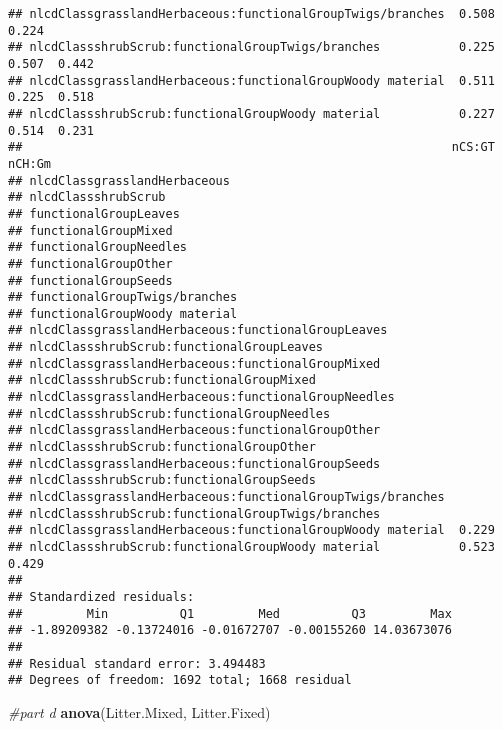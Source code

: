 \documentclass[]{article}
\newenvironment{Shaded}{\begin{snugshade}}{\end{snugshade}}
\newcommand{\CommentTok}[1]{\textcolor[rgb]{0.56,0.35,0.01}{\textit{#1}}}
\newcommand{\KeywordTok}[1]{\textcolor[rgb]{0.13,0.29,0.53}{\textbf{#1}}}
\newcommand{\NormalTok}[1]{#1}
\begin{document}
\begin{verbatim}
## nlcdClassgrasslandHerbaceous:functionalGroupTwigs/branches  0.508  0.224       
## nlcdClassshrubScrub:functionalGroupTwigs/branches           0.225  0.507  0.442
## nlcdClassgrasslandHerbaceous:functionalGroupWoody material  0.511  0.225  0.518
## nlcdClassshrubScrub:functionalGroupWoody material           0.227  0.514  0.231
##                                                            nCS:GT nCH:Gm
## nlcdClassgrasslandHerbaceous                                            
## nlcdClassshrubScrub                                                     
## functionalGroupLeaves                                                   
## functionalGroupMixed                                                    
## functionalGroupNeedles                                                  
## functionalGroupOther                                                    
## functionalGroupSeeds                                                    
## functionalGroupTwigs/branches                                           
## functionalGroupWoody material                                           
## nlcdClassgrasslandHerbaceous:functionalGroupLeaves                      
## nlcdClassshrubScrub:functionalGroupLeaves                               
## nlcdClassgrasslandHerbaceous:functionalGroupMixed                       
## nlcdClassshrubScrub:functionalGroupMixed                                
## nlcdClassgrasslandHerbaceous:functionalGroupNeedles                     
## nlcdClassshrubScrub:functionalGroupNeedles                              
## nlcdClassgrasslandHerbaceous:functionalGroupOther                       
## nlcdClassshrubScrub:functionalGroupOther                                
## nlcdClassgrasslandHerbaceous:functionalGroupSeeds                       
## nlcdClassshrubScrub:functionalGroupSeeds                                
## nlcdClassgrasslandHerbaceous:functionalGroupTwigs/branches              
## nlcdClassshrubScrub:functionalGroupTwigs/branches                       
## nlcdClassgrasslandHerbaceous:functionalGroupWoody material  0.229       
## nlcdClassshrubScrub:functionalGroupWoody material           0.523  0.429
## 
## Standardized residuals:
##         Min          Q1         Med          Q3         Max 
## -1.89209382 -0.13724016 -0.01672707 -0.00155260 14.03673076 
## 
## Residual standard error: 3.494483 
## Degrees of freedom: 1692 total; 1668 residual
\end{verbatim}

\begin{Shaded}
\begin{Highlighting}[]
\CommentTok{#part d}
\KeywordTok{anova}\NormalTok{(Litter.Mixed, Litter.Fixed)}
\end{Highlighting}
\end{Shaded}
\end{document}
